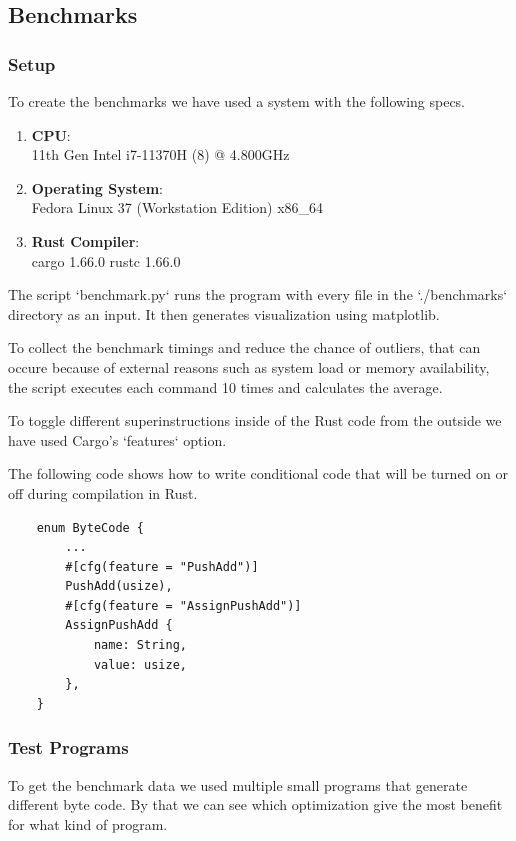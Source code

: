 \documentclass{article}
\begin{document}
\subsection{Benchmarks}
\subsubsection{Setup}

To create the benchmarks we have used a system with the following specs.

\begin{enumerate}
    \item \textbf{CPU}:\\
        11th Gen Intel i7-11370H (8) @ 4.800GHz 
    \item \textbf{Operating System}:\\
        Fedora Linux 37 (Workstation Edition) x86\_64 
    \item \textbf{Rust Compiler}:\\
        cargo 1.66.0
        rustc 1.66.0
\end{enumerate}

The script `benchmark.py` runs the program with every file in the
`./benchmarks` directory as an input. It then generates visualization using
matplotlib.

To collect the benchmark timings and reduce the chance of outliers, that can
occure because of external reasons such as system load or memory availability,
the script executes each command 10 times and calculates the average.

To toggle different superinstructions inside of the Rust code from the 
outside we have used Cargo's `features` option.

The following code shows how to write conditional code that will be turned on
or off during compilation in Rust.

\begin{verbatim}
    enum ByteCode {
        ...
        #[cfg(feature = "PushAdd")]
        PushAdd(usize),
        #[cfg(feature = "AssignPushAdd")]
        AssignPushAdd {
            name: String,
            value: usize,
        },
    }
\end{verbatim}

\subsubsection{Test Programs}
To get the benchmark data we used multiple small programs that generate
different byte code. By that we can see which optimization give the most
benefit for what kind of program.
\end{document}
